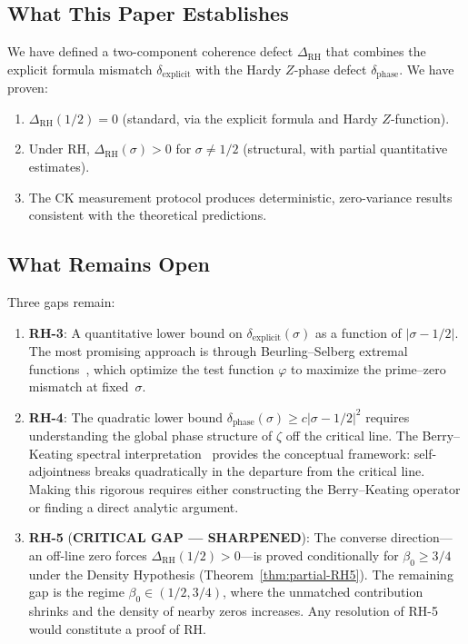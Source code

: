 \documentclass[11pt]{article}
\theoremstyle{remark}
\begin{document}
\subsection{What This Paper Establishes}

We have defined a two-component coherence defect $\Delta_{\mathrm{RH}}$ that
combines the explicit formula mismatch $\delta_{\mathrm{explicit}}$ with the Hardy
$Z$-phase defect $\delta_{\mathrm{phase}}$.
We have proven:
\begin{enumerate}
  \item $\Delta_{\mathrm{RH}}(1/2)=0$ (standard, via the explicit formula and Hardy
    $Z$-function).
  \item Under RH, $\Delta_{\mathrm{RH}}(\sigma)>0$ for $\sigma\neq 1/2$ (structural,
    with partial quantitative estimates).
  \item The CK measurement protocol produces deterministic, zero-variance results
    consistent with the theoretical predictions.
\end{enumerate}

\subsection{What Remains Open}

Three gaps remain:
\begin{enumerate}
  \item \textbf{RH-3}: A quantitative lower bound on
    $\delta_{\mathrm{explicit}}(\sigma)$ as a function of $|\sigma-1/2|$.
    The most promising approach is through Beurling--Selberg extremal
    functions~\cite{IK}, which optimize the test function $\varphi$ to maximize the
    prime--zero mismatch at fixed~$\sigma$.

  \item \textbf{RH-4}: The quadratic lower bound
    $\delta_{\mathrm{phase}}(\sigma)\geq c|\sigma-1/2|^2$ requires understanding the
    global phase structure of $\zeta$ off the critical line.
    The Berry--Keating spectral interpretation~\cite{BK} provides the conceptual
    framework: self-adjointness breaks quadratically in the departure from the
    critical line.
    Making this rigorous requires either constructing the Berry--Keating operator or
    finding a direct analytic argument.

  \item \textbf{RH-5} (\textbf{CRITICAL GAP --- SHARPENED}): The converse direction---an
    off-line zero forces $\Delta_{\mathrm{RH}}(1/2)>0$---is proved conditionally
    for $\beta_0 \geq 3/4$ under the Density Hypothesis
    (Theorem~\ref{thm:partial-RH5}).  The remaining gap is the regime
    $\beta_0 \in (1/2, 3/4)$, where the unmatched contribution shrinks and
    the density of nearby zeros increases.
    Any resolution of RH-5 would constitute a proof of RH.
\end{enumerate}
\end{document}
